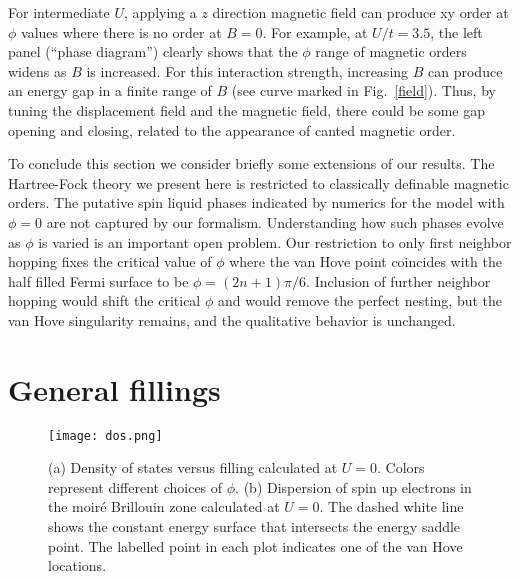 \documentclass[%
reprint,
superscriptaddress,
twocolumn,
 amsmath,amssymb,
 aps,
 prb,
]{revtex4-2}
\begin{document}
For intermediate $U$, applying a $z$ direction magnetic field can produce xy order at $\phi$ values where there is no order at $B=0$. For example, at $U/t=3.5$, the left panel (``phase diagram'') clearly shows that the $\phi$ range of magnetic orders widens as $B$ is increased. For this interaction strength, increasing $B$ can produce an energy gap in a finite range of $B$ (see curve marked in Fig.~\ref{field}). Thus, by tuning the displacement field and the magnetic field, there could be some gap opening and closing, related to the appearance of canted magnetic order.

To conclude this section we consider briefly some extensions of our results. The Hartree-Fock theory we present here is restricted to classically definable magnetic orders. The putative spin liquid phases indicated by numerics for the model with $\phi=0$ are not captured by our formalism. Understanding how such phases evolve as $\phi$ is varied is an important open problem. Our restriction to only first neighbor hopping fixes the critical value of $\phi$ where the van Hove point coincides with the half filled Fermi surface to be $\phi=(2n+1)\pi/6$. Inclusion of further neighbor hopping would shift the critical $\phi$ and would remove the perfect nesting, but the van Hove singularity remains, and the qualitative behavior is unchanged.


\section{General fillings }\label{sec:phase diagram all}

\begin{figure}[htb]
  \texttt{[image: dos.png]}
  \caption{(a) Density of states versus filling calculated at $U=0$. Colors represent different choices of $\phi$. (b) Dispersion of spin up electrons in the moir\'e Brillouin zone calculated at $U=0$. The dashed white line shows the constant energy surface that intersects the energy saddle point. The labelled point in each plot indicates one of the van Hove locations. }
  \label{fig:DOS}
\end{figure}
\end{document}
